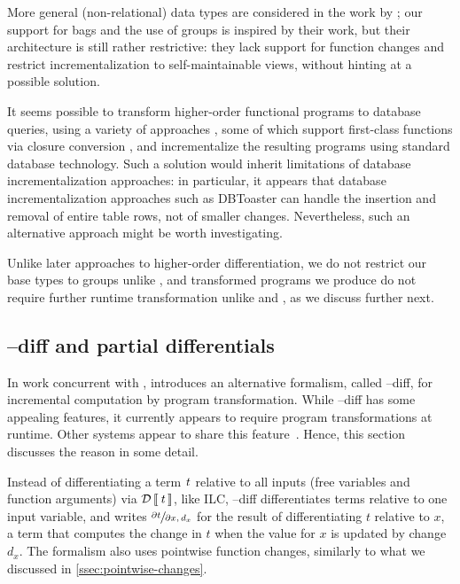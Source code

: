 More general (non-relational) data types are considered in the work by \citet{GlucheGrust97Incr};
our support for bags and the use of groups is inspired by their work,
but their architecture is still rather restrictive: they lack
support for function changes and restrict incrementalization to
self-maintainable views, without hinting at a possible solution.

It seems possible to transform higher-order functional programs
to database queries, using a variety of approaches
\citep{Grust:2009:FDP:1559845.1559982,Cheney2013practical}, some
of which support first-class functions via closure conversion
\citep{Grust2013first,Grust2013functions}, and incrementalize the
resulting programs using standard database technology. Such a
solution would inherit limitations of database incrementalization
approaches: in particular, it appears that database
incrementalization approaches such as DBToaster can handle the
insertion and removal of entire table rows, not of smaller
changes. Nevertheless, such an alternative approach might be
worth investigating.

Unlike later approaches to higher-order differentiation, we do
not restrict our base types to
groups unlike \citet{Koch2016incremental}, and transformed programs we
produce do not require further runtime
transformation unlike \citet{Koch2016incremental} and \citet{Huesca2015incrementality},
as we discuss further next.

\newcommand{\ldiff}{\TitleLambda--diff}
\subsection{\TitleLambda{}--diff and partial differentials}
\label{sec:rw-partial-differentials}
In work concurrent with \citet{CaiEtAl2014ILC}, \citet{Huesca2015incrementality}
introduces an alternative formalism, called \ldiff, for incremental computation
by program transformation. While \ldiff{} has some appealing features, it
currently appears to require program transformations at
runtime. Other systems appear to share this
feature~\citep{Koch2016incremental}. Hence, this section
discusses the reason in some detail.

Instead of differentiating a term \ensuremath{\Varid{t}} relative to all inputs (free
variables and function arguments) via \ensuremath{\Derive{\Varid{t}}}, like ILC,
\ldiff{} differentiates terms
relative to one input variable, and writes
$\sfrac{\partial t}{\partial x, d_x}$
for the result of differentiating $t$
relative to $x$, a term that computes the change in $t$ when the
value for $x$ is updated by change $d_x$. The formalism also uses
pointwise function changes, similarly to what we discussed in
\cref{ssec:pointwise-changes}.

